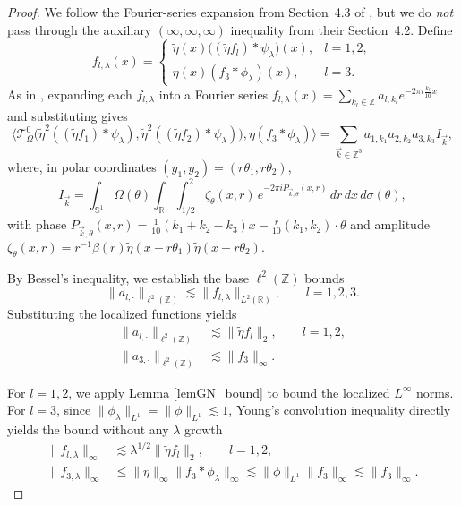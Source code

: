 \documentclass[11pt]{amsart}
\begin{document}
\begin{proof}
	We follow the Fourier-series expansion from Section~4.3 of \cite{bhojak2025alternate}, but we do \emph{not} pass through the auxiliary $(\infty,\infty,\infty)$ inequality from their Section~4.2.
	Define
	\[
	f_{l,\lambda}(x)=
	\begin{cases}
		\widetilde\eta(x)\bigl((\widetilde\eta f_l)*\psi_\lambda\bigr)(x), & l=1,2,\\[1mm]
		\eta(x)(f_3*\phi_\lambda)(x), & l=3.
	\end{cases}
	\]
	As in \cite[Section~4.3]{bhojak2025alternate}, expanding each $f_{l,\lambda}$ 
	into a Fourier series $f_{l,\lambda}(x)=\sum_{k_l\in\mathbb Z}a_{l,k_l}
	e^{-2\pi i\frac{k_l}{10}x}$ and substituting gives
	\[
	\Big\langle \mathcal{T}_\Omega^0\bigl(\widetilde\eta^2((\widetilde\eta f_1)*\psi_\lambda),
	\widetilde\eta^2((\widetilde\eta f_2)*\psi_\lambda)\bigr),\eta(f_3*\phi_\lambda)\Big\rangle
	= \sum_{\vec k\in\mathbb Z^3} a_{1,k_1}a_{2,k_2}a_{3,k_3}I_{\vec k},
	\]
	where, in polar coordinates $(y_1,y_2)=(r\theta_1,r\theta_2)$,
	\[
	I_{\vec k} = \int_{\mathbb S^1}\Omega(\theta)\int_{\mathbb R}\int_{1/2}^{2}
	\zeta_\theta(x,r)\,e^{-2\pi i P_{\vec k,\theta}(x,r)}\,dr\,dx\,d\sigma(\theta),
	\]
	with phase $P_{\vec k,\theta}(x,r)=\tfrac{1}{10}(k_1+k_2-k_3)x
	-\tfrac{r}{10}(k_1,k_2)\cdot\theta$ and amplitude
	$\zeta_\theta(x,r)=r^{-1}\beta(r)\widetilde\eta(x-r\theta_1)\widetilde\eta(x-r\theta_2)$.
	
	By Bessel's inequality, we establish the base $\ell^2(\mathbb Z)$ bounds
	\[
	\|a_{l, \cdot} \|_{\ell^2(\mathbb Z)} \lesssim \|f_{l,\lambda}\|_{L^2(\mathbb R)}, \qquad l=1,2,3.
	\]
	Substituting the localized functions yields
	\begin{align}
		\|a_{l, \cdot} \|_{\ell^2(\mathbb Z)} &\lesssim \|\widetilde\eta f_l\|_2, \qquad l=1,2, \label{eq-l2-12} \\
		\|a_{3, \cdot} \|_{\ell^2(\mathbb Z)} &\lesssim \|f_3\|_\infty. \label{eq-l2-3}
	\end{align}
	
	For $l=1,2$, we apply Lemma \ref{lemGN_bound} to bound the localized $L^\infty$ norms. For $l=3$, since $\|\phi_\lambda\|_{L^1} = \|\phi\|_{L^1} \lesssim 1$, Young's convolution inequality directly yields the bound without any $\lambda$ growth
	\begin{align*}
		\|f_{l,\lambda}\|_\infty &\lesssim \lambda^{1/2}\|\widetilde\eta f_l\|_2, \qquad l=1,2, \\
		\|f_{3,\lambda}\|_\infty &\le \|\eta\|_\infty \|f_3 * \phi_\lambda\|_\infty \lesssim \|\phi\|_{L^1} \|f_3\|_\infty \lesssim \|f_3\|_\infty.
	\end{align*}
	

\end{proof}
\end{document}
